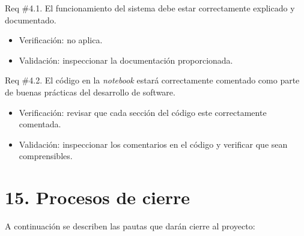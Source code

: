 \documentclass[
11pt, %
codirector, %
]{charter}
\begin{document}
Req \#4.1. El funcionamiento del sistema debe estar correctamente explicado y documentado.

\begin{itemize}
	\item Verificación: no aplica.
	
	\item Validación: inspeccionar la documentación proporcionada. 
\end{itemize}

Req \#4.2. El código en la \textit{notebook} estará correctamente comentado como parte de buenas prácticas del desarrollo de software.

\begin{itemize}
	\item Verificación: revisar que cada sección del código este correctamente comentada.
	
	\item Validación: inspeccionar los comentarios en el código y verificar que sean comprensibles. 
\end{itemize}

\section{15. Procesos de cierre}    
\label{sec:cierre}

A continuación se describen las pautas que darán cierre al proyecto:
\end{document}
